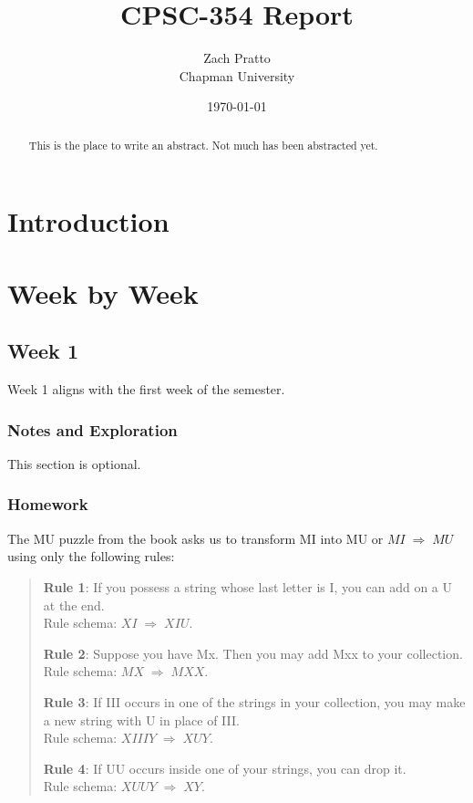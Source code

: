 \documentclass{article}
\title{CPSC-354 Report}
\author{Zach Pratto  \\ Chapman University}
\date{\today}
\theoremstyle{plain}
\theoremstyle{definition}
\theoremstyle{remark}
\begin{document}
\maketitle

\begin{abstract}
This is the place to write an abstract. Not much has been abstracted yet.
\end{abstract}

\setcounter{tocdepth}{3}
\tableofcontents

\section{Introduction}\label{intro}

\section{Week by Week}\label{homework}

\subsection{Week 1}

Week 1 aligns with the first week of the semester. 

\subsubsection{Notes and Exploration}

This section is optional. 

\subsubsection{Homework}

The MU puzzle from the book asks us to transform MI into MU or $MI \;\Rightarrow\; MU$ using
only the following rules:

\begin{quote}
\textbf{Rule 1}:
If you possess a string whose last letter is I, you can add on a U at the end.\\ 
Rule schema: $XI \;\Rightarrow\; XIU$.

\vspace{1em}

\textbf{Rule 2}:
Suppose you have Mx. Then you may add Mxx to your collection.\\
Rule schema: $MX \;\Rightarrow\; MXX$.

\vspace{1em}

\textbf{Rule 3}:
If III occurs in one of the strings in your collection, you may make a new
string with U in place of III.\\
Rule schema: $XIIIY \;\Rightarrow\; XUY$.

\vspace{1em}

\textbf{Rule 4}:
If UU occurs inside one of your strings, you can drop it.\\
Rule schema: $XUUY \;\Rightarrow\; XY$.
\end{quote}
\end{document}
